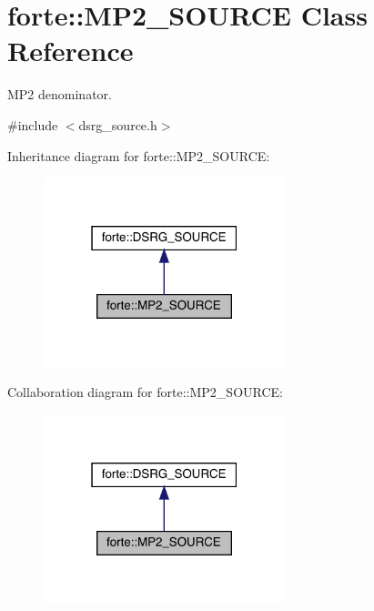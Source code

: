 \hypertarget{classforte_1_1_m_p2___s_o_u_r_c_e}{}\section{forte\+:\+:M\+P2\+\_\+\+S\+O\+U\+R\+CE Class Reference}
\label{classforte_1_1_m_p2___s_o_u_r_c_e}


M\+P2 denominator.  




{\ttfamily \#include $<$dsrg\+\_\+source.\+h$>$}



Inheritance diagram for forte\+:\+:M\+P2\+\_\+\+S\+O\+U\+R\+CE\+:
\nopagebreak
\begin{figure}[H]
\begin{center}
\leavevmode
\includegraphics[width=199pt]{classforte_1_1_m_p2___s_o_u_r_c_e__inherit__graph}
\end{center}
\end{figure}


Collaboration diagram for forte\+:\+:M\+P2\+\_\+\+S\+O\+U\+R\+CE\+:
\nopagebreak
\begin{figure}[H]
\begin{center}
\leavevmode
\includegraphics[width=199pt]{classforte_1_1_m_p2___s_o_u_r_c_e__coll__graph}
\end{center}
\end{figure}
